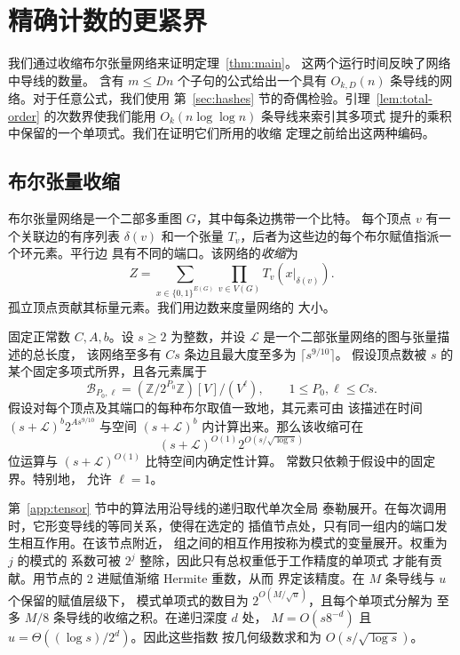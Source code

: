 \section{精确计数的更紧界}\label{app:quantitative}

我们通过收缩布尔张量网络来证明定理~\ref{thm:main}。
这两个运行时间反映了网络中导线的数量。
含有 $m\le Dn$ 个子句的公式给出一个具有 $O_{k,D}(n)$
条导线的网络。对于任意公式，我们使用
第~\ref{sec:hashes} 节的奇偶检验。引理~\ref{lem:total-order}
的次数界使我们能用 $O_k(n\log\log n)$ 条导线来索引其多项式
提升的乘积中保留的一个单项式。我们在证明它们所用的收缩
定理之前给出这两种编码。

\subsection{布尔张量收缩}
\label{subsec:tensor-interface}

布尔张量网络是一个二部多重图 $G$，其中每条边携带一个比特。
每个顶点 $v$ 有一个关联边的有序列表 $\delta(v)$ 和一个张量
$T_v$，后者为这些边的每个布尔赋值指派一个环元素。平行边
具有不同的端口。该网络的\emph{收缩}为
\[
 Z=\sum_{x\in\{0,1\}^{E(G)}}\prod_{v\in V(G)} T_v(x|_{\delta(v)}).
\]
孤立顶点贡献其标量元素。我们用边数来度量网络的
大小。

\begin{theorem}[布尔张量收缩]\label{thm:tensor-contraction}
固定正常数 $C,A,b$。设 $s\ge2$ 为整数，并设
$\mathcal L$ 是一个二部张量网络的图与张量描述的总长度，
该网络至多有 $Cs$ 条边且最大度至多为 $\lceil s^{9/10}\rceil$。
假设顶点数被 $s$ 的某个固定多项式所界，且各元素属于
\[
 \mathcal B_{P_0,\ell}
   =(\mathbb Z/2^{P_0}\mathbb Z)[V]/(V^\ell),
 \qquad 1\le P_0,\ell\le Cs.
\]
假设对每个顶点及其端口的每种布尔取值一致地，其元素可由
该描述在时间 $(s+\mathcal L)^b2^{A s^{9/10}}$ 与空间
$(s+\mathcal L)^b$ 内计算出来。那么该收缩可在
\[
 (s+\mathcal L)^{O(1)}
  2^{O(s/\sqrt{\log s})}
\]
位运算与 $(s+\mathcal L)^{O(1)}$ 比特空间内确定性计算。
常数只依赖于假设中的固定界。特别地，
允许 $\ell=1$。
\end{theorem}

第~\ref{app:tensor} 节中的算法用沿导线的递归取代单次全局
泰勒展开。在每次调用时，它形变导线的等同关系，使得在选定的
插值节点处，只有同一组内的端口发生相互作用。在该节点附近，
组之间的相互作用按称为模式的变量展开。权重为 $j$ 的模式的
系数可被 $2^j$ 整除，因此只有总权重低于工作精度的单项式
才能有贡献。用节点的 2 进赋值渐缩 Hermite 重数，从而
界定该精度。在 $M$ 条导线与 $u$ 个保留的赋值层级下，
模式单项式的数目为 $2^{O(M/\sqrt{u})}$，且每个单项式分解为
至多 $M/8$ 条导线的收缩之积。在递归深度 $d$ 处，
$M=O(s8^{-d})$ 且 $u=\Theta((\log s)/2^d)$。因此这些指数
按几何级数求和为 $O(s/\sqrt{\log s})$。

